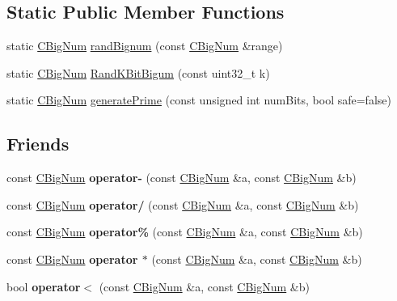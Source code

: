 \subsection*{Static Public Member Functions}
\begin{DoxyCompactItemize}
\item 
static \mbox{\hyperlink{class_c_big_num}{C\+Big\+Num}} \mbox{\hyperlink{class_c_big_num_a83e20522f042dd2b738bd26e21605e3b}{rand\+Bignum}} (const \mbox{\hyperlink{class_c_big_num}{C\+Big\+Num}} \&range)
\item 
static \mbox{\hyperlink{class_c_big_num}{C\+Big\+Num}} \mbox{\hyperlink{class_c_big_num_a200174f8261baebceb64b24a2d91f33f}{Rand\+K\+Bit\+Bigum}} (const uint32\+\_\+t k)
\item 
static \mbox{\hyperlink{class_c_big_num}{C\+Big\+Num}} \mbox{\hyperlink{class_c_big_num_a4579e2136563a20844d60d9fe513e1fe}{generate\+Prime}} (const unsigned int num\+Bits, bool safe=false)
\end{DoxyCompactItemize}
\subsection*{Friends}
\begin{DoxyCompactItemize}
\item 
\mbox{\label{class_c_big_num_aeb0210adda76affb66975146b1168f71}} 
const \mbox{\hyperlink{class_c_big_num}{C\+Big\+Num}} {\bfseries operator-\/} (const \mbox{\hyperlink{class_c_big_num}{C\+Big\+Num}} \&a, const \mbox{\hyperlink{class_c_big_num}{C\+Big\+Num}} \&b)
\item 
\mbox{\label{class_c_big_num_ac5a9fb08b1522f0cbcc30f87bac72f4b}} 
const \mbox{\hyperlink{class_c_big_num}{C\+Big\+Num}} {\bfseries operator/} (const \mbox{\hyperlink{class_c_big_num}{C\+Big\+Num}} \&a, const \mbox{\hyperlink{class_c_big_num}{C\+Big\+Num}} \&b)
\item 
\mbox{\label{class_c_big_num_a8abffdb8b9ce531fef9fc3067d7329ef}} 
const \mbox{\hyperlink{class_c_big_num}{C\+Big\+Num}} {\bfseries operator\%} (const \mbox{\hyperlink{class_c_big_num}{C\+Big\+Num}} \&a, const \mbox{\hyperlink{class_c_big_num}{C\+Big\+Num}} \&b)
\item 
\mbox{\label{class_c_big_num_a13401e5870de07251f76a199ca1b152f}} 
const \mbox{\hyperlink{class_c_big_num}{C\+Big\+Num}} {\bfseries operator $\ast$} (const \mbox{\hyperlink{class_c_big_num}{C\+Big\+Num}} \&a, const \mbox{\hyperlink{class_c_big_num}{C\+Big\+Num}} \&b)
\item 
\mbox{\label{class_c_big_num_a6db3085f36d565f1dd8589c8386d3a2f}} 
bool {\bfseries operator$<$} (const \mbox{\hyperlink{class_c_big_num}{C\+Big\+Num}} \&a, const \mbox{\hyperlink{class_c_big_num}{C\+Big\+Num}} \&b)
\end{DoxyCompactItemize}


